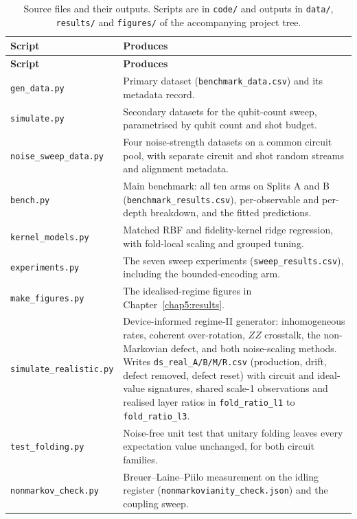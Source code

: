 \documentclass[Thesis.tex]{subfiles}
\begin{document}
\begin{longtable}{p{4.9cm} >{\raggedright\arraybackslash}p{10.0cm}}
\caption[Source files and their outputs]{Source files and their outputs. Scripts are in \texttt{code/} and
outputs in \texttt{data/}, \texttt{results/} and \texttt{figures/} of the
accompanying project tree.}
\label{tab:ch4_files}\\
\toprule
\textbf{Script} & \textbf{Produces} \\
\midrule
\endfirsthead
\toprule
\textbf{Script} & \textbf{Produces} \\
\midrule
\endhead
\bottomrule
\endfoot
\texttt{gen\_data.py} &
Primary dataset (\texttt{benchmark\_data.csv}) and its metadata record. \\
\texttt{simulate.py} &
Secondary datasets for the qubit-count sweep, parametrised by
qubit count and shot budget. \\
\texttt{noise\_sweep\_data.py} &
Four noise-strength datasets on a common circuit pool, with separate circuit
and shot random streams and alignment metadata. \\
\texttt{bench.py} &
Main benchmark: all ten arms on Splits A and B
(\texttt{benchmark\_results.csv}), per-observable and per-depth breakdown, and
the fitted predictions. \\
\texttt{kernel\_models.py} &
Matched RBF and fidelity-kernel ridge regression, with fold-local scaling and
grouped tuning. \\
\texttt{experiments.py} &
The seven sweep experiments (\texttt{sweep\_results.csv}), including the
bounded-encoding arm. \\
\texttt{make\_figures.py} &
The idealised-regime figures in Chapter~\ref{chap5:results}. \\
\texttt{simulate\_realistic.py} &
Device-informed regime-II generator: inhomogeneous rates, coherent over-rotation,
$ZZ$ crosstalk, the non-Markovian defect, and both noise-scaling methods. Writes
\texttt{ds\_real\_A/B/M/R.csv} (production, drift, defect removed, defect reset)
with circuit and ideal-value signatures, shared scale-1 observations and
realised layer ratios in \texttt{fold\_ratio\_l1} to \texttt{fold\_ratio\_l3}. \\
\addlinespace
\texttt{test\_folding.py} &
Noise-free unit test that unitary folding leaves every expectation value
unchanged, for both circuit families. \\
\addlinespace
\texttt{nonmarkov\_check.py} &
Breuer--Laine--Piilo measurement on the idling register
(\texttt{nonmarkovianity\_check.json}) and the coupling sweep. \\

\end{longtable}
\end{document}
